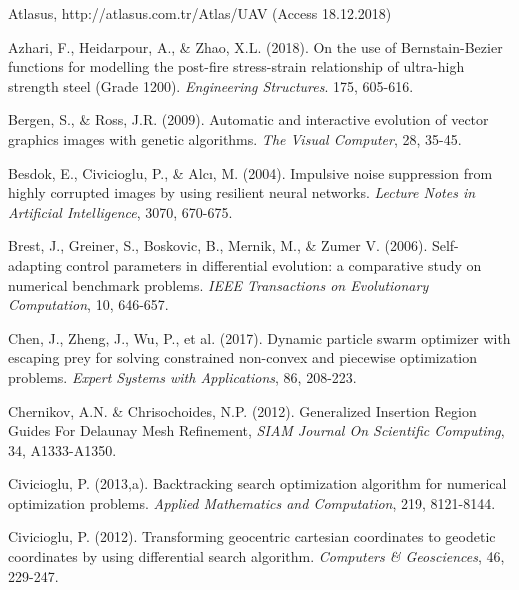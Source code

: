 \documentclass[preprint,10pt,3p]{elsarticle}
\begin{document}
\begin{thebibliography}{00}

    Atlasus, http://atlasus.com.tr/Atlas/UAV   (Access 18.12.2018)

   Azhari, F., Heidarpour, A., \& Zhao, X.L. (2018). On the use of Bernstain-Bezier functions for modelling the post-fire stress-strain relationship of ultra-high strength steel (Grade 1200). \emph{Engineering Structures}. 175, 605-616.

  Bergen, S., \& Ross, J.R. (2009). Automatic and interactive evolution of vector graphics images with genetic algorithms. \emph{The Visual Computer}, 28, 35-45.

  Besdok, E., Civicioglu,  P., \& Alc\i, M. (2004). Impulsive noise suppression from highly corrupted images by using resilient neural networks. \emph{Lecture Notes in Artificial Intelligence}, 3070, 670-675.

  Brest, J., Greiner, S., Boskovic, B., Mernik, M., \& Zumer V. (2006). Self-adapting control parameters in differential evolution: a comparative study on numerical benchmark problems. \emph{IEEE Transactions on Evolutionary Computation}, 10, 646-657.

 Chen, J.,  Zheng, J.,  Wu, P.,  et al. (2017). Dynamic particle swarm optimizer with escaping prey for solving constrained non-convex and piecewise optimization problems.  \emph{Expert Systems with Applications},  86, 208-223.

  Chernikov, A.N. \&  Chrisochoides, N.P. (2012).  Generalized Insertion Region Guides For Delaunay Mesh Refinement,  \emph{SIAM Journal On Scientific Computing},  34,  A1333-A1350.

 Civicioglu, P. (2013,a). Backtracking search optimization algorithm for numerical optimization problems. \emph{Applied Mathematics and Computation}, 219,  8121-8144.

  Civicioglu,  P. (2012). Transforming geocentric cartesian coordinates to geodetic coordinates by using differential search algorithm. \emph{Computers \& Geosciences},  46,  229-247.


\end{thebibliography}
\end{document}
